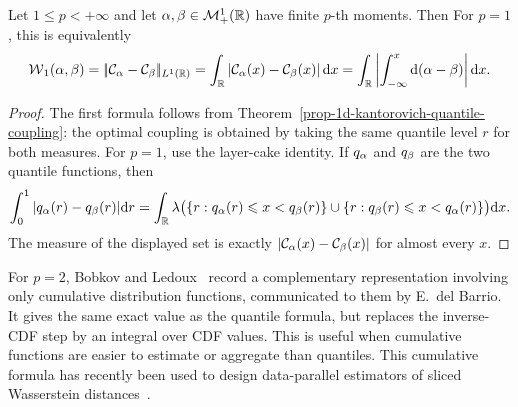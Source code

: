 \begin{prop}\label{prop-wass-quantile-1d}
	Let $1\leq p<+\infty$ and let $\alpha,\beta\in\mathcal{M}_+^1(\mathbb{R})$ have finite $p$-th moments. Then
	For $p=1$, this is equivalently
		\begin{equation}\label{eq-w1-1d}
			\operatorname{\mathcal{W}}_1(\alpha,\beta)
			=
			|\!| \mathcal{C}_{\alpha}-\mathcal{C}_{\beta} |\!|_{L^1(\mathbb{R})}
			=
			\int_{\mathbb{R}} \left\lvert\mathcal{C}_{\alpha}(x)-\mathcal{C}_{\beta}(x)\right\rvert\mathrm{d} x
			=
			\int_{\mathbb{R}} \left\lvert\int_{-\infty}^x\mathrm{d}(\alpha-\beta)\right\rvert\mathrm{d} x.
		\end{equation}
\end{prop}
\begin{proof}
	The first formula follows from Theorem~\ref{prop-1d-kantorovich-quantile-coupling}: the optimal coupling is obtained by taking the same quantile level $r$ for both measures. For $p=1$, use the layer-cake identity. If $q_\alpha$ and $q_\beta$ are the two quantile functions, then
	\[
		\int_0^1 |q_\alpha(r)-q_\beta(r)|\mathrm{d} r
		=
		\int_{\mathbb{R}}
		\lambda\bigl(\{r:q_\alpha(r)\leqslant x<q_\beta(r)\}\cup\{r:q_\beta(r)\leqslant x<q_\alpha(r)\}\bigr)\mathrm{d} x.
	\]
	The measure of the displayed set is exactly $|\mathcal{C}_{\alpha}(x)-\mathcal{C}_{\beta}(x)|$ for almost every $x$.
\end{proof}

For $p=2$, Bobkov and Ledoux~\cite{BobkovLedoux2019EmpiricalKantorovich} record a complementary representation involving only cumulative distribution functions, communicated to them by E.~del Barrio. It gives the same exact value as the quantile formula, but replaces the inverse-CDF step by an integral over CDF values. This is useful when cumulative functions are easier to estimate or aggregate than quantiles. This cumulative formula has recently been used to design data-parallel estimators of sliced Wasserstein distances~\cite{VauthierMerigotKorba2026CDFSW}.


